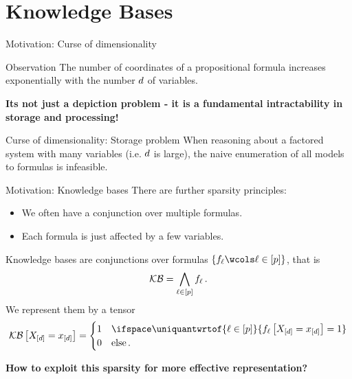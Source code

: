 \documentclass{beamer}
\begin{document}
    {\frame[plain]{\titlepage}}
    \showoutlineatsection


    \section{Knowledge Bases}

    \begin{frame}{Motivation: Curse of dimensionality}
        \begin{block}{Observation}
            The number of coordinates of a propositional formula increases exponentially with the number $d$ of variables.
        \end{block}
        \begin{center}
            \bf  Its not just a depiction problem - it is a fundamental intractability in storage and processing!
        \end{center}

        \begin{block}{Curse of dimensionality: Storage problem}
            When reasoning about a factored system with many variables (i.e. $d$ is large), the naive enumeration of all models to formulas is infeasible.
        \end{block}
    \end{frame}

    \begin{frame}{Motivation: Knowledge bases}
        There are further sparsity principles:
        \begin{itemize}
            \item We often have a conjunction over multiple formulas.
            \item Each formula is just affected by a few variables.
        \end{itemize}

        \begin{definition}
            Knowledge bases are conjunctions over formulas $\{\formulaof{\selindex} \wcols \selindexin\}$, that is
            \begin{align*}
                \mathcal{KB} = \bigwedge_{\ell\in[p]} f_{\ell} \, .
            \end{align*}
            We represent them by a tensor
            \begin{align*}
                \kbat{\indexedshortcatvariables}
                = \begin{cases}
                      1 & \ifspace \uniquantwrtof{\selindexin}{\formulaofat{\selindex}{\indexedshortcatvariables} = 1} \\
                      0 & \text{else} \, .
                \end{cases}
            \end{align*}
        \end{definition}

        \begin{center}
            \bf How to exploit this sparsity for more effective representation?
        \end{center}

    \end{frame}
\end{document}
